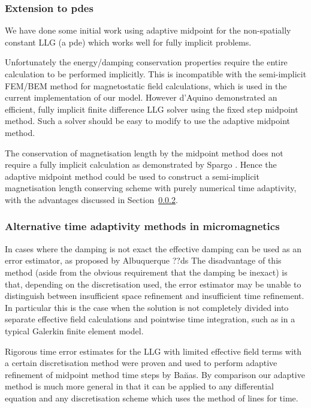 \subsubsection{Extension to pdes}

We have done some initial work using adaptive midpoint for the non-spatially constant LLG (\ie a pde) which works well for fully implicit problems.

Unfortunately the energy/damping conservation properties require the entire calculation to be performed implicitly.
This is incompatible with the semi-implicit FEM/BEM method for magnetostatic field calculations,\cite{Koehler1997} which is used in the current implementation of our model.
However d'Aquino \etal demonstrated an efficient, fully implicit finite difference LLG solver using the fixed step midpoint method\cite{DAquino2005}.
Such a solver should be easy to modify to use the adaptive midpoint method.

The conservation of magnetisation length by the midpoint method does not require a fully implicit calculation as demonstrated by Spargo \etal\cite{Spargo2003a}.
Hence the adaptive midpoint method could be used to construct a semi-implicit magnetisation length conserving scheme with purely numerical time adaptivity, with the advantages discussed in Section~\ref{sec:altern-time-adapt}.


\subsubsection{Alternative time adaptivity methods in micromagnetics}
\label{sec:altern-time-adapt}

In cases where the damping is not exact the effective damping can be used as an error estimator, as proposed by Albuquerque \etal\cite{Albuquerque2001}
??ds The disadvantage of this method (aside from the obvious requirement that the damping be inexact) is that, depending on the discretisation used, the error estimator may be unable to distinguish between insufficient space refinement and insufficient time refinement.
In particular this is the case when the solution is not completely divided into separate effective field calculations and pointwise time integration, such as in a typical Galerkin finite element model.

Rigorous time error estimates for the LLG with limited effective field terms with a certain discretisation method were proven and used to perform adaptive refinement of midpoint method time steps by Ban̆as.\cite{Banas-thesis}
By comparison our adaptive method is much more general in that it can be applied to any differential equation and any discretisation scheme which uses the method of lines for time.


